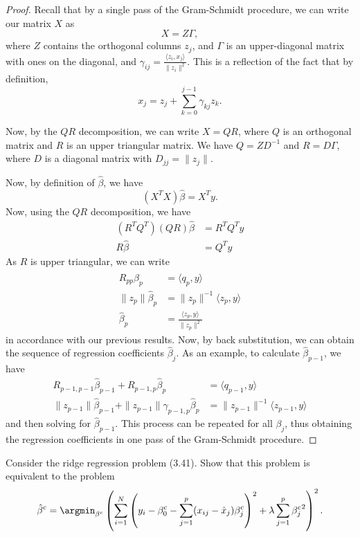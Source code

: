 \begin{proof}
    Recall that by a single pass of the Gram-Schmidt procedure, we can write our matrix $X$ as \[
        X = Z \Gamma,
        \] where $Z$ contains the orthogonal columns $z_j$, and $\Gamma$ is an upper-diagonal matrix with ones on the diagonal, and $\gamma_{ij} = \frac{\langle z_i, x_j \rangle}{\| z_i \|^2}$. This is a reflection of the fact that by definition, \[
            x_j = z_j + \sum_{k=0}^{j-1} \gamma_{kj} z_k.
            \]

            Now, by the $QR$ decomposition, we can write $X = QR$, where $Q$ is an orthogonal matrix and $R$ is an upper triangular matrix.  We have $Q = Z D^{-1}$ and $R = D\Gamma$, where $D$ is a diagonal matrix  with $D_{jj} = \| z_j \|$.  

    Now, by definition of $\hat \beta$, we have \[
        (X^T X) \hat \beta = X^T y.
        \]  Now, using the $QR$ decomposition, we have \begin{align*}
            (R^T Q^T) (QR) \hat \beta &= R^T Q^T y \\
            R \hat \beta &= Q^T y
        \end{align*}
    As $R$ is upper triangular, we can write \begin{align*}
        R_{pp} \hat \beta_p &= \langle q_p, y \rangle \\
        \| z_p \| \hat \beta_p &= \| z_p \|^{-1} \langle z_p, y \rangle \\
        \hat \beta_p &= \frac{\langle z_p, y \rangle}{\| z_p \|^2}
    \end{align*} in accordance with our previous results.  Now, by back substitution, we can obtain the sequence of regression coefficients $\hat \beta_j$.  As an example, to calculate $\hat \beta_{p-1}$, we have \begin{align*}
        R_{p-1, p-1} \hat \beta_{p-1} + R_{p-1,p} \hat \beta_p &= \langle q_{p-1}, y \rangle \\
        \| z_{p-1} \| \hat \beta_{p-1} + \| z_{p-1} \| \gamma_{p-1,p} \hat \beta_p &= \| z_{p-1} \|^{-1} \langle z_{p-1}, y \rangle 
    \end{align*} and then solving for $\hat \beta_{p-1}$. This process can be repeated for all $\beta_j$, thus obtaining the regression coefficients in one pass of the Gram-Schmidt procedure.
\end{proof}

\begin{exer}
    Consider the ridge regression problem (3.41).  Show that this problem is equivalent to the problem \[
        \hat \beta^c = \argmin_{\beta^c} \left( \sum_{i=1}^{N} \left( y_i - \beta^c_0 - \sum_{j=1}^{p}(x_{ij} - \hat x_j) \beta^c_j \right)^2 + \lambda \sum_{j=1}^{p}{\beta_j^c}^2 \right)^2.
        \]
\end{exer}

